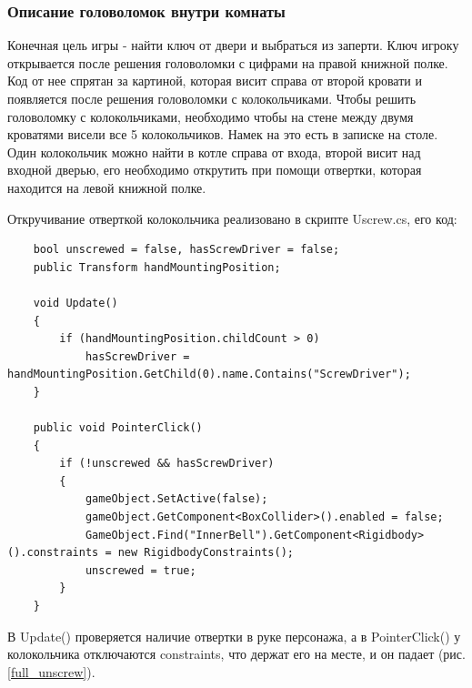 \subsubsection{Описание головоломок внутри комнаты}
\tab[0.75cm]Конечная цель игры - найти ключ от двери и выбраться из заперти. Ключ игроку открывается после решения головоломки с цифрами на правой книжной полке. Код от нее спрятан за картиной, которая висит справа от второй кровати и появляется после решения головоломки с колокольчиками. Чтобы решить головоломку с колокольчиками, необходимо чтобы на стене между двумя кроватями висели все 5 колокольчиков. Намек на это есть в записке на столе. Один колокольчик можно найти в котле справа от входа, второй висит над входной дверью, его необходимо открутить при помощи отвертки, которая находится на левой книжной полке. 

Откручивание отверткой колокольчика реализовано в скрипте Uscrew.cs, его код:


\begin{small}
    \begin{verbatim}
    bool unscrewed = false, hasScrewDriver = false;
    public Transform handMountingPosition;

    void Update()
    {
        if (handMountingPosition.childCount > 0)
            hasScrewDriver = handMountingPosition.GetChild(0).name.Contains("ScrewDriver");
    }
    
    public void PointerClick()
    {
        if (!unscrewed && hasScrewDriver)
        {
            gameObject.SetActive(false);
            gameObject.GetComponent<BoxCollider>().enabled = false;
            GameObject.Find("InnerBell").GetComponent<Rigidbody>().constraints = new RigidbodyConstraints();
            unscrewed = true;
        }
    }
    \end{verbatim}
\end{small}

В Update() проверяется наличие отвертки в руке персонажа, а в PointerClick() у колокольчика отключаются constraints, что держат его на месте, и он падает (рис. \ref{full_unscrew}).


